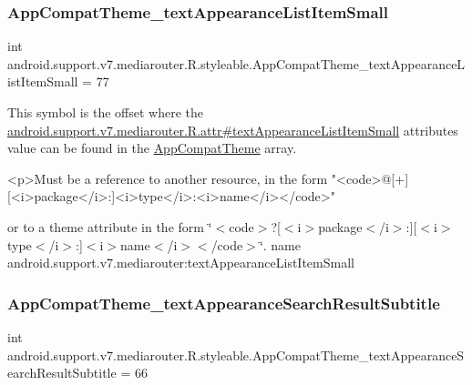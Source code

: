 \subsubsection{\texorpdfstring{App\+Compat\+Theme\+\_\+text\+Appearance\+List\+Item\+Small}{AppCompatTheme\_textAppearanceListItemSmall}}
{\footnotesize\ttfamily int android.\+support.\+v7.\+mediarouter.\+R.\+styleable.\+App\+Compat\+Theme\+\_\+text\+Appearance\+List\+Item\+Small = 77\hspace{0.3cm}{\ttfamily [static]}}

This symbol is the offset where the \hyperlink{classandroid_1_1support_1_1v7_1_1mediarouter_1_1R_1_1attr_af9ef3c5878f35566f474d773100422af}{android.\+support.\+v7.\+mediarouter.\+R.\+attr\#text\+Appearance\+List\+Item\+Small} attribute\textquotesingle{}s value can be found in the \hyperlink{classandroid_1_1support_1_1v7_1_1mediarouter_1_1R_1_1styleable_a4e3d3900c75d49aeb2f283cac00214d6}{App\+Compat\+Theme} array.

\begin{DoxyVerb}      <p>Must be a reference to another resource, in the form "<code>@[+][<i>package</i>:]<i>type</i>:<i>name</i></code>"
\end{DoxyVerb}
 or to a theme attribute in the form \char`\"{}$<$code$>$?\mbox{[}$<$i$>$package$<$/i$>$\+:\mbox{]}\mbox{[}$<$i$>$type$<$/i$>$\+:\mbox{]}$<$i$>$name$<$/i$>$$<$/code$>$\char`\"{}.  name android.\+support.\+v7.\+mediarouter\+:text\+Appearance\+List\+Item\+Small \mbox{\label{classandroid_1_1support_1_1v7_1_1mediarouter_1_1R_1_1styleable_a505319de1733441b256077401041e226}} 
\subsubsection{\texorpdfstring{App\+Compat\+Theme\+\_\+text\+Appearance\+Search\+Result\+Subtitle}{AppCompatTheme\_textAppearanceSearchResultSubtitle}}
{\footnotesize\ttfamily int android.\+support.\+v7.\+mediarouter.\+R.\+styleable.\+App\+Compat\+Theme\+\_\+text\+Appearance\+Search\+Result\+Subtitle = 66\hspace{0.3cm}{\ttfamily [static]}}

